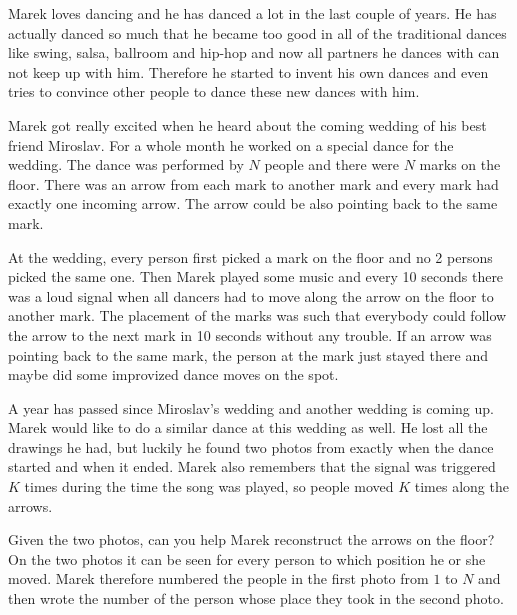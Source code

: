 

Marek loves dancing and he has danced a lot in the last couple of years. He has actually danced so
much that he became too good in all of the traditional dances like swing, salsa, ballroom and
hip-hop and now all partners he dances with can not keep up with him.
Therefore he started to invent his own dances and even tries to convince other people to dance these
new dances with him.

Marek got really excited when he heard about the coming wedding of his best friend Miroslav. For a
whole month he worked on a special dance for the wedding. The dance was performed by $N$ people and
there were $N$ marks on the floor. There was an arrow from each mark to another mark and every
mark had exactly one incoming arrow. The arrow could be also pointing back to the same mark.

At the wedding, every person first picked a mark on the floor and no 2 persons picked the same one.
Then Marek played some music and every 10 seconds there was a loud signal when all
dancers had to move along the arrow on the floor to another mark. The placement of the marks was
such that everybody could follow the arrow to the next mark in 10 seconds without any trouble.
If an arrow was pointing back to the same mark, the person at the mark just stayed there and maybe
did some improvized dance moves on the spot.

A year has passed since Miroslav's wedding and another wedding is coming up. Marek would like to do
a similar dance at this wedding as well. He lost all the drawings he had, but
luckily he found two photos from exactly when the dance started and when it ended. Marek also
remembers that the signal was triggered $K$ times during the time the song was played, so people
moved $K$ times along the arrows.

Given the two photos, can you help Marek reconstruct the arrows on the floor? %
On the two photos it
can be seen for every person to which position he or she moved. Marek therefore numbered the people
in the first photo from $1$ to $N$ and then wrote the number of the person whose place they took in
the second photo.

